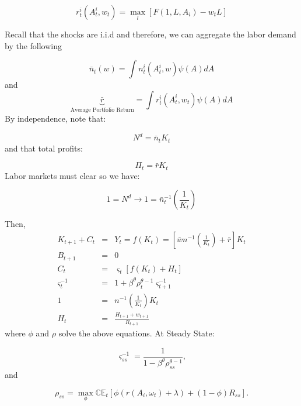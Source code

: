 \documentclass{article}
\begin{document}
\begin{equation*}
r_{t}^{i}\left( A_{t}^{i},w_{t}\right) =\max_{l}\left[ F\left(
1,L,A_{i}\right) -w_{t}L\right]
\end{equation*}

Recall that the shocks are i.i.d and therefore, we can aggregate the labor
demand by the following

\begin{equation*}
\bar{n}_{t}\left( w\right) =\int n_{t}^{i}\left( A_{t}^{i},w\right) \psi
(A)dA
\end{equation*}%
and
\begin{equation*}
\underbrace{\bar{r}}_{\text{Average Portfolio Return}}=\int r_{t}^{i}\left(
A_{t}^{i},w_{t}\right) \psi (A)dA
\end{equation*}%
By independence, note that:

\begin{equation*}
N^{d}=\bar{n}_{t}K_{t}
\end{equation*}%
and that total profits:

\begin{equation*}
\Pi _{t}=\bar{r}K_{t}
\end{equation*}%
Labor markets must clear so we have:

\begin{equation*}
1=N^{d}\rightarrow 1=\bar{n}_{t}^{-1}\left( \frac{1}{K_{t}}\right)
\end{equation*}

Then,
\begin{eqnarray*}
K_{t+1}+C_{t} &=&Y_{t}=f\left( K_{t}\right) =\left[ \bar{w}n^{-1}\left(
\frac{1}{K_{t}}\right) +\bar{r}\right] K_{t} \\
B_{t+1} &=&0 \\
C_{t} &=&\varsigma _{t}\left[ f\left( K_{t}\right) +H_{t}\right] \\
\varsigma _{t}^{-1} &=&1+\beta ^{\theta }\rho _{t}^{\theta -1}\varsigma
_{t+1}^{-1} \\
1 &=&n^{-1}\left( \frac{1}{K_{t}}\right) K_{t} \\
H_{t} &=&\frac{H_{t+1}+w_{t+1}}{R_{t+1}}
\end{eqnarray*}%
where $\phi $ and $\rho $ solve the above equations. At Steady State:

\begin{equation*}
\varsigma _{ss}^{-1}=\frac{1}{1-\beta ^{\theta }\rho _{ss}^{\theta -1}},
\end{equation*}%
and

\begin{equation*}
\rho _{ss}=\max_{\phi }\mathbb{CE}_{t}\left[ \phi \left( r\left(
A_{i},\omega _{t}\right) +\lambda \right) +\left( 1-\phi \right) R_{ss}%
\right] .
\end{equation*}
\end{document}
